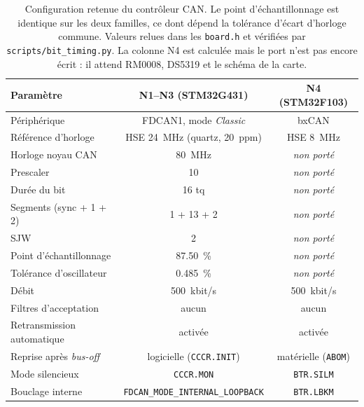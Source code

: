 
\begin{table}[H]
\centering\small
\begin{tabular}{lcc}
\toprule
\textbf{Paramètre} & \textbf{N1--N3 (STM32G431)} & \textbf{N4 (STM32F103)} \\
\midrule
Périphérique & FDCAN1, mode \emph{Classic} & bxCAN \\
Référence d'horloge & HSE \SI{24}{MHz} (quartz, \SI{20}{ppm}) & HSE \SI{8}{MHz} \\
Horloge noyau CAN & \SI{80}{MHz} & \itshape non porté \\
Prescaler & 10 & \itshape non porté \\
Durée du bit & 16 tq & \itshape non porté \\
Segments (sync + 1 + 2) & 1 + 13 + 2 & \itshape non porté \\
SJW & 2 & \itshape non porté \\
Point d'échantillonnage & \SI{87.50}{\percent} & \itshape non porté \\
Tolérance d'oscillateur & \SI{0.485}{\percent} & \itshape non porté \\
Débit & \SI{500}{kbit/s} & \SI{500}{kbit/s} \\
\midrule
Filtres d'acceptation & aucun & aucun \\
Retransmission automatique & activée & activée \\
Reprise après \emph{bus-off} & logicielle (\texttt{CCCR.INIT}) & matérielle (\texttt{ABOM}) \\
Mode silencieux & \texttt{CCCR.MON} & \texttt{BTR.SILM} \\
Bouclage interne & \texttt{FDCAN\_MODE\_INTERNAL\_LOOPBACK} & \texttt{BTR.LBKM} \\
\bottomrule
\end{tabular}
\caption{Configuration retenue du contrôleur CAN. Le point d'échantillonnage est identique sur les deux familles, ce dont dépend la tolérance d'écart d'horloge commune. Valeurs relues dans les \texttt{board.h} et vérifiées par \texttt{scripts/bit\_timing.py}. La colonne N4 est calculée mais le port n'est pas encore écrit : il attend RM0008, DS5319 et le schéma de la carte.}
\label{tab:config-logicielle}
\end{table}
